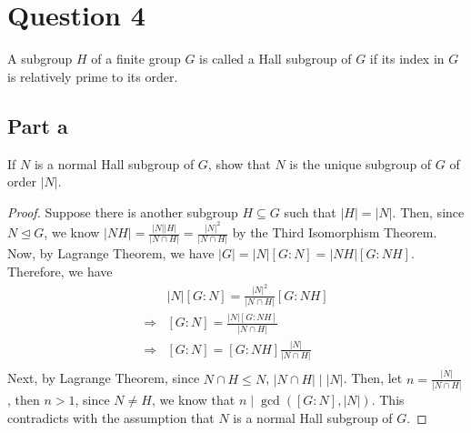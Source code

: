 \section{Question 4}

\begin{question}
    A subgroup $H$ of a finite group $G$ is called a Hall subgroup of $G$ if its index in $G$ is relatively prime to its order.
\end{question}

\subsection{Part a}

\begin{question}
    If $N$ is a normal Hall subgroup of $G$, show that $N$ is the unique subgroup of $G$ of order $|N|$.
\end{question}

\begin{answer}
    \begin{proof}
        Suppose there is another subgroup $H \subseteq G$ such that $\lvert H \rvert = \lvert N \rvert$. Then, since $N \trianglelefteq G$, we know $\lvert NH \rvert = \tfrac{\lvert N \rvert \lvert H\rvert}{\lvert N \cap H \rvert} = \tfrac{\lvert N \rvert^2}{\lvert N \cap H \rvert}$ by the Third Isomorphism Theorem. Now, by Lagrange Theorem, we have $\lvert G \rvert  = \lvert N \rvert [G:N] = \lvert NH \rvert [G:NH]$. Therefore, we have
        \begin{equation}
            \begin{aligned}
                &\lvert N \rvert [G:N] = \tfrac{\lvert N \rvert^2}{\lvert N \cap H \rvert}[G:NH]\\
                \Rightarrow &[G:N] = \tfrac{\lvert N \rvert [G:NH]}{\lvert N \cap H \rvert}\\
                \Rightarrow &[G:N] = [G:NH]\tfrac{\lvert N \rvert}{\lvert N \cap H \rvert}\\
            \end{aligned}
        \end{equation}
        Next, by Lagrange Theorem, since $N \cap H \leqslant N$, $\lvert N \cap H \rvert \mid \lvert N \rvert$. Then, let $n = \tfrac{\lvert N \rvert}{\lvert N \cap H \rvert}$, then $n > 1$, since $N \neq H$, we know that $ n \mid \gcd([G:N], \lvert N \rvert)$. This contradicts with the assumption that $N$ is a normal Hall subgroup of $G$.
    \end{proof}
\end{answer}

